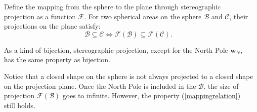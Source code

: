 \documentclass[final]{IEEEtran}
\begin{document}
\begin{lemma}\label{lem:subset}
    Define the mapping from the sphere to the plane through stereographic projection as a function $\mathcal{F}$. For two spherical areas on the sphere $\mathcal{B}$ and $\mathcal{C}$, their projections on the plane satisfy:
    \begin{equation}
        \mathcal{B}\subseteq \mathcal{C} \Leftrightarrow \mathcal{F}(\mathcal{B})\subseteq \mathcal{F}(\mathcal{C}).
        \label{mappingrelation}
    \end{equation}
    \label{lem:mappingrelation}
\end{lemma}

\begin{IEEEproof}
    As a kind of bijection, stereographic projection, except for the North Pole  $\textbf{w}_N$, has the same property as bijection.
\end{IEEEproof}
\begin{remark}
    Notice that a closed shape on the sphere is not always projected to a closed shape on the projection plane. Once the North Pole is included in the $\mathcal{B}$, the size of projection $\mathcal{F}(\mathcal{B})$ goes to infinite. However, the property (\ref{mappingrelation}) still holds.
\end{remark}
\end{document}
